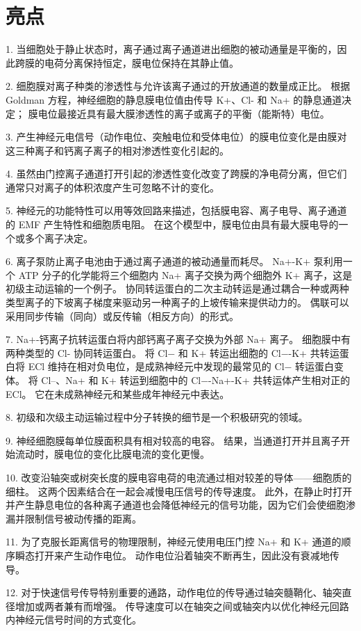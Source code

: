 \section{亮点}

1. 当细胞处于静止状态时，离子通过离子通道进出细胞的被动通量是平衡的，因此跨膜的电荷分离保持恒定，膜电位保持在其静止值。 


2. 细胞膜对离子种类的渗透性与允许该离子通过的开放通道的数量成正比。
根据 Goldman 方程，神经细胞的静息膜电位值由传导 K+、Cl- 和 Na+ 的静息通道决定；
膜电位最接近具有最大膜渗透性的离子或离子的平衡（能斯特）电位。 


3. 产生神经元电信号（动作电位、突触电位和受体电位）的膜电位变化是由膜对这三种离子和钙离子离子的相对渗透性变化引起的。 


4. 虽然由门控离子通道打开引起的渗透性变化改变了跨膜的净电荷分离，但它们通常只对离子的体积浓度产生可忽略不计的变化。


5. 神经元的功能特性可以用等效回路来描述，包括膜电容、离子电导、离子通道的 EMF 产生特性和细胞质电阻。
在这个模型中，膜电位由具有最大膜电导的一个或多个离子决定。 


6. 离子泵防止离子电池由于通过离子通道的被动通量而耗尽。
Na+-K+ 泵利用一个 ATP 分子的化学能将三个细胞内 Na+ 离子交换为两个细胞外 K+ 离子，这是初级主动运输的一个例子。
协同转运蛋白的二次主动转运是通过耦合一种或两种类型离子的下坡离子梯度来驱动另一种离子的上坡传输来提供动力的。
偶联可以采用同步传输（同向）或反传输（相反方向）的形式。 


7. Na+-钙离子抗转运蛋白将内部钙离子离子交换为外部 Na+ 离子。
细胞膜中有两种类型的 Cl- 协同转运蛋白。
将 Cl− 和 K+ 转运出细胞的 Cl−-K+ 共转运蛋白将 ECl 维持在相对负电位，是成熟神经元中发现的最常见的 Cl− 转运蛋白变体。
将 Cl–、Na+ 和 K+ 转运到细胞中的 Cl−-Na+-K+ 共转运体产生相对正的 ECl。
它在未成熟神经元和某些成年神经元中表达。 


8. 初级和次级主动运输过程中分子转换的细节是一个积极研究的领域。


9. 神经细胞膜每单位膜面积具有相对较高的电容。
结果，当通道打开并且离子开始流动时，膜电位的变化比膜电流的变化更慢。


10. 改变沿轴突或树突长度的膜电容电荷的电流通过相对较差的导体——细胞质的细柱。
这两个因素结合在一起会减慢电压信号的传导速度。
此外，在静止时打开并产生静息电位的各种离子通道也会降低神经元的信号功能，因为它们会使细胞渗漏并限制信号被动传播的距离。 


11. 为了克服长距离信号的物理限制，神经元使用电压门控 Na+ 和 K+ 通道的顺序瞬态打开来产生动作电位。
动作电位沿着轴突不断再生，因此没有衰减地传导。 


12. 对于快速信号传导特别重要的通路，动作电位的传导通过轴突髓鞘化、轴突直径增加或两者兼有而增强。
传导速度可以在轴突之间或轴突内以优化神经元回路内神经元信号时间的方式变化。










